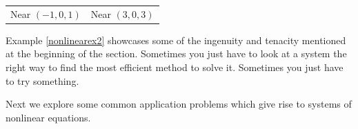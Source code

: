 \begin{ex}
\begin{enumerate}
\begin{center}
\begin{tabular}{cc}
Near $(-1,0,1)$ 

&

Near $(3,0,3)$ \\

\end{tabular}

\end{center}
\end{enumerate}


\end{ex}

Example \ref{nonlinearex2} showcases some of the ingenuity and tenacity mentioned at the beginning of the section.  Sometimes you just have to look at a system the right way to find the most efficient method to solve it.  Sometimes you just have to try something.  

\smallskip

Next we explore some common application problems which give rise to systems of nonlinear equations.

